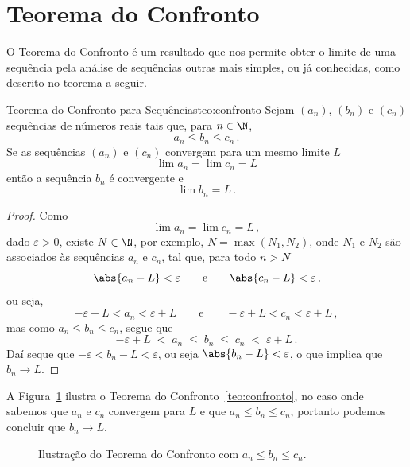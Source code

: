\section{Teorema do Confronto}

O Teorema do Confronto é um resultado que nos permite
obter o limite de uma sequência pela análise de sequências outras mais simples,
ou já conhecidas, como descrito no teorema a seguir.

\begin{teorema}{Teorema do Confronto para Sequências}{teo:confronto}
  Sejam $(a_n)$, $(b_n)$ e $(c_n)$
  sequências de números reais tais que, para $n\in\N$,
  \[
    a_n \leq b_n \leq c_n  \,.
  \]
  Se as sequências $(a_n)$ e $(c_n)$ convergem para um mesmo limite $L$
  \[
    \lim a_n = \lim c_n = L
  \]
  então a sequência $b_n$ é convergente e
  \[
    \lim b_n = L \,.
  \]
\end{teorema}
\begin{proof}
  Como
  \[
    \lim a_n=\lim c_n=L  \,,
  \]
  dado $\varepsilon>0$, existe $N\in \N$, por exemplo, $N=\max(N_1, N_2)$,
  onde $N_1$ e $N_2$ são associados às sequências $a_n$ e $c_n$,
  tal que, para todo $n>N$
  \[
    \abs{a_n-L} < \varepsilon
    \qquad\text{e}\qquad
    \abs{c_n-L} < \varepsilon \,,
  \]
  ou seja,
  \[
    -\varepsilon+L < a_n < \varepsilon+L
    \qquad\text{e}\qquad
    -\varepsilon+L < c_n < \varepsilon+L   \,,
  \]
  mas como $a_n\leq b_n\leq c_n$, segue que
  \[
    -\varepsilon+L \;<\; a_n \;\leq\; b_n \;\leq\; c_n \;<\; \varepsilon+L   \,.
  \]
  Daí seque que $-\varepsilon <b_n-L<\varepsilon$,
  ou seja $\abs{b_n-L} < \varepsilon$, o que implica que $b_n\to L$.
\end{proof}

A Figura~\ref{fig:teorema_confronto} ilustra o
Teorema do Confronto~\ref{teo:confronto}, no caso
onde sabemos que $a_n$ e $c_n$ convergem
para $L$ e que $a_n \leq b_n \leq c_n$,
portanto podemos concluir que $b_n\to L$.

\begin{figure}[h]
  \centering
  
  \caption{Ilustração do Teorema do Confronto com $a_n \leq b_n \leq c_n$.}
  \label{fig:teorema_confronto}
\end{figure}

